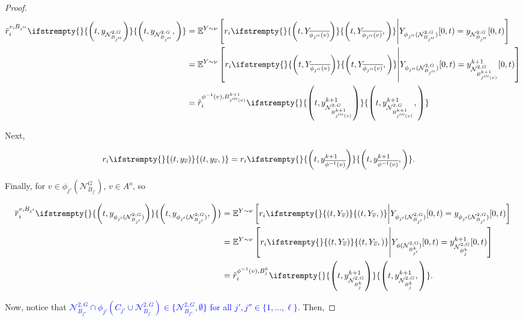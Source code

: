 \documentclass[12pt]{article}
\newcommand{\mb}{\mathbb}
\newcommand{\mc}{\mathcal}
\newcommand{\ov}{\overline}
\newcommand{\tb}{\textcolor{blue}}
\newcommand{\exmu}[2]{\mb{E}^{#1}\left[#2\right]}	%
\newcommand{\gneigh}[2]{\mc{N}^{#1}_{#2}}			%
\newcommand{\dgneigh}[2]{\mc{N}^{2,#1}_{#2}}		%
\newcommand{\cl}[1]{\ov{#1}}						%
\newcommand{\indx}[1]{^{#1}}						%
\newcommand{\rate}{r}								%
\newcommand{\xg}{y}									%
\newcommand{\vind}[1]{_{#1}}						%
\newcommand{\tmi}[1]{#1}							%
\newcommand{\stpara}[1]{_{#1}}						%
\newcommand{\psize}{\ell}							%
\newcommand{\tmepro}[3]{
\ifstrempty{#3}{
	\left(#1,#2\right)}{
	\left(#1,#2,#3\right)}}							%
\newcommand{\Xg}{Y}									%
\newcommand{\brate}{\alt{\rate}}					%
\newcommand{\inte}[1]{{#1}^\mathrm{o}}				%
\newcommand{\alt}[1]{\tilde{#1}}					%
\newcommand{\mm}{\nu}								%
\newcommand{\bgrate}{\ov{\rate}}					%
\newcommand{\vjpara}[2]{^{#1,#2}}					%
\begin{document}
\begin{proof}
\begin{align}
\brate\vjpara{v}{B_{j''}}\stpara{i}\tmepro{t}{\xg\vind{\dgneigh{G}{B_{j''}}}}{} &= \exmu{\Xg\sim \mm}{\rate\stpara{i}\tmepro{t}{\Xg\vind{\cl{\phi_{j''}(v)}}}{}\middle|\Xg\vind{\phi_{j''}(\dgneigh{G}{B_{j''}})}\tmi{[0,t)} = \xg\vind{\dgneigh{G}{B_{j''}}}\tmi{[0,t)}}\nonumber\\
&=\exmu{\Xg\sim \mm}{\rate\stpara{i}\tmepro{t}{\Xg\vind{\cl{\phi_{j''}(v)}}}{}\middle|\Xg\vind{\phi_{j''}(\dgneigh{G}{B_{j''}})}\tmi{[0,t)} = \xg\indx{k+1}\vind{\dgneigh{G}{B\indx{k+1}_{j'''(v)}}}\tmi{[0,t)}}\nonumber\\
&= \brate\vjpara{\phi^{-1}(v)}{B\indx{k+1}_{j'''(v)}}\stpara{i}\tmepro{t}{\xg\indx{k+1}\vind{\dgneigh{G}{B\indx{k+1}_{j'''(v)}}}}{}
\label{Uq::brateup}
\end{align}

Next,

\begin{align}
\rate\stpara{i}\tmepro{t}{\xg\vind{\cl{v}}}{} &=\rate\stpara{i}\tmepro{t}{\xg\indx{k+1}\vind{\cl{\phi^{-1}(v)}}}{}.
\label{Uq::rateup}
\end{align}

Finally, for \(v \in \phi_{j'}(\gneigh{G}{B_{j'}})\), \(v \in \inte{A}\), so 

\begin{align}
\bgrate\vjpara{v}{B_{j'}}\stpara{i}\tmepro{t}{\xg\vind{\phi_{j'}(\dgneigh{G}{B_{j'}})}}{} &= \exmu{\Xg\sim\mm}{\rate\stpara{i}\tmepro{t}{\Xg\vind{\cl{v}}}{}\middle|\Xg\vind{\phi_{j'}(\dgneigh{G}{B_{j'}})}\tmi{[0,t)} = \xg\vind{\phi_{j'}(\dgneigh{G}{B_{j'}})}\tmi{[0,t)}}\nonumber\\
&= \exmu{\Xg\sim\mm}{\rate\stpara{i}\tmepro{t}{\Xg\vind{\cl{v}}}{}\middle|\Xg\vind{\phi(\dgneigh{G}{B\indx{k}_{j'}})}\tmi{[0,t)} = \xg\indx{k+1}\vind{\dgneigh{G}{B\indx{k}_{j}}}\tmi{[0,t)}}\nonumber\\
&= \brate\vjpara{\phi^{-1}(v)}{B\indx{k}_j}\stpara{i}\tmepro{t}{\xg\indx{k+1}\vind{\dgneigh{G}{B\indx{k}_j}}}{}.
\label{Uq::bgrateup}
\end{align}

Now, notice that \tb{\(\dgneigh{G}{B_{j''}} \cap \phi_{j'}\left(C_{j'}\cup\dgneigh{G}{B_{j'}}\right) \in \{\dgneigh{G}{B_{j''}},\emptyset\}\) for all \(j',j'' \in \{1,\dots,\psize\}\).} Then,


\end{proof}
\end{document}
